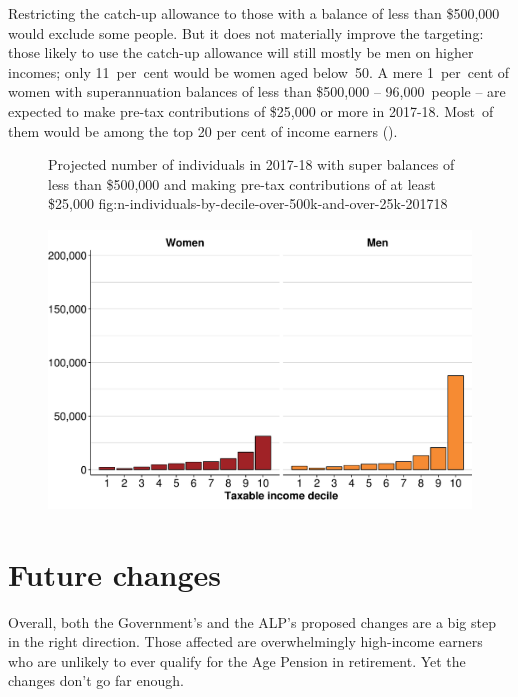 \documentclass[continuous]{grattan}
\begin{document}
Restricting the catch-up allowance to those with a balance of less than \$500,000 would exclude some people. 
But it does not materially improve the targeting: those likely to use the catch-up allowance will still mostly be men on higher incomes; 
only 11~per~cent would be women aged below~50.
A mere 1~per~cent of women with superannuation balances of less than \$500,000 -- 96,000~people -- are expected to make pre-tax contributions of \$25,000 or more in 2017-18.
Most~of them would be among the top 20 per cent of income earners (). %

\begin{figure}%
%
{Projected number of individuals in 2017-18 with super balances of less than \$500,000 and making pre-tax contributions of at least \$25,000}%
{fig:n-individuals-by-decile-over-500k-and-over-25k-201718}

\includegraphics[width=4.47222in,height=2.94759954545455in]{figure/n-individuals-by-decile-over-500k-and-over-25k-201718-1} 

\end{figure}

\chapter{Future changes\label{chap:future-changes}}
Overall, both the Government’s and the ALP’s proposed changes are a big step in the right direction. 
Those affected are overwhelmingly high-income earners who are unlikely to ever qualify for the Age Pension in retirement. 
Yet the changes don’t go far enough.
\end{document}
